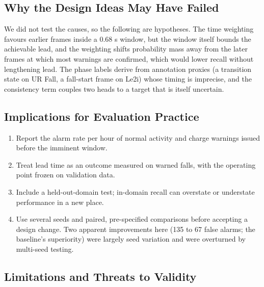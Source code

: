 \documentclass[journal]{IEEEtran}
\begin{document}
\subsection{Why the Design Ideas May Have Failed}\label{sub:why}

We did not test the causes, so the following are hypotheses. The time weighting favours earlier frames inside a 0.68 s window, but the window itself bounds the achievable lead, and the weighting shifts probability mass away from the later frames at which most warnings are confirmed, which would lower recall without lengthening lead. The phase labels derive from annotation proxies (a transition state on UR Fall, a fall-start frame on Le2i) whose timing is imprecise, and the consistency term couples two heads to a target that is itself uncertain.


\subsection{Implications for Evaluation Practice}\label{sub:practice}
\begin{enumerate}
\item Report the alarm rate per hour of normal activity and charge warnings issued before the imminent window.
\item Treat lead time as an outcome measured on warned falls, with the operating point frozen on validation data.
\item Include a held-out-domain test; in-domain recall can overstate or understate performance in a new place.
\item Use several seeds and paired, pre-specified comparisons before accepting a design change. Two apparent improvements here (135 to 67 false alarms; the baseline's superiority) were largely seed variation and were overturned by multi-seed testing.
\end{enumerate}


\subsection{Limitations and Threats to Validity}\label{sub:limits}
\end{document}

